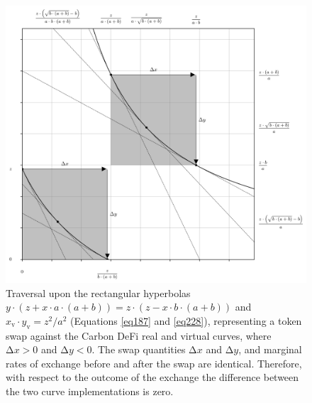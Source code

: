 \documentclass{article}
\begin{document}
\begin{figure}[ht]
    \centering
    \includegraphics[width=\textwidth]{fig44.png}
    \captionsetup{
        justification=raggedright,
        singlelinecheck=false,
        font=small,
        labelfont=bf,
        labelsep=quad,
        format=plain
    }
    \caption{Traversal upon the rectangular hyperbolas $y \cdot \left( z + x \cdot a \cdot \left( a + b \right) \right) = z \cdot \left( z - x \cdot b \cdot \left( a + b \right) \right)$ and $x_{\text{v}} \cdot y_{\text{v}} = z^{2} / a^{2}$ (Equations \ref{eq187} and \ref{eq228}), representing a token swap against the Carbon DeFi real and virtual curves, where $\mathrm{\Delta}x > 0$ and $\mathrm{\Delta}y < 0$. The swap quantities $\mathrm{\Delta}x$ and $\mathrm{\Delta}y$, and marginal rates of exchange before and after the swap are identical. Therefore, with respect to the outcome of the exchange the difference between the two curve implementations is zero.}
    \label{fig44}
\end{figure}
\end{document}
